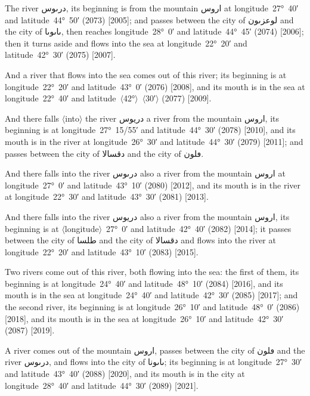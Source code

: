 \documentclass[11pt]{article}
\newcommand{\Pg}[1]{\marginpar{\footnotesize #1}}
\newcommand{\Ang}[1]{\ensuremath{#1}}
\begin{document}
The river \textarabic{درٮوس}, its beginning is from the mountain \textarabic{اروس} at longitude~27°~40′ and latitude~44°~50′ (2073) [2005]; and passes between the city of \textarabic{لوعزٮون} and the city of \textarabic{ٮاٮوٮا}, then reaches longitude~28°~0′ and latitude~44°~45′ (2074) [2006]\Pg{p. 137}; then it turns aside and flows into the sea at longitude~22°~20′ and latitude~42°~30′ (2075) [2007].

And a river that flows into the sea comes out of this river; its beginning is at longitude~22°~20′ and latitude~43°~0′ (2076) [2008], and its mouth is in the sea at longitude~22°~40′ and latitude~\Ang{\langle}42°\Ang{\rangle}~\Ang{\langle}30′\Ang{\rangle} (2077) [2009].

And there falls \Ang{\langle}into\Ang{\rangle} the river \textarabic{دريوس} a river from the mountain \textarabic{اروس}, its beginning is at longitude~27°~15/55′ and latitude~44°~30′ (2078) [2010], and its mouth is in the river at longitude~26°~30′ and latitude~44°~30′ (2079) [2011]; and passes between the city of \textarabic{دقسالا} and the city of \textarabic{ڡلون}.

And there falls into the river \textarabic{درٮوس} also a river from the mountain \textarabic{اروس} at longitude~27°~0′ and latitude~43°~10′ (2080) [2012], and its mouth is in the river at longitude~22°~30′ and latitude~43°~30′ (2081) [2013].

And there falls into the river \textarabic{دريوس} also a river from the mountain \textarabic{اروس}, its beginning is at \Ang{\langle}longitude\Ang{\rangle}~27°~0′ and latitude~42°~40′ (2082) [2014]; it passes between the city of \textarabic{طلسا} and the city of \textarabic{دقسالا} and flows into the river at longitude~22°~20′ and latitude~43°~10′ (2083) [2015].

Two rivers come out of this river, both flowing into the sea: the first of them, its beginning is at longitude~24°~40′ and latitude~48°~10′ (2084) [2016], and its mouth is in the sea at longitude~24°~40′ and latitude~42°~30′ (2085) [2017]; and the second river, its beginning is at longitude~26°~10′ and latitude~48°~0′ (2086) [2018], and its mouth is in the sea at longitude~26°~10′ and latitude~42°~30′ (2087) [2019].

A river comes out of the mountain \textarabic{اروس}, passes between the city of \textarabic{ڡلون} and the river \textarabic{درٮوس}, and flows into the city of \textarabic{ٮاٮونا}; its beginning is at longitude~27°~30′ and latitude~43°~40′ (2088) [2020], and its mouth is in the city at longitude~28°~40′ and latitude~44°~30′ (2089) [2021].
\end{document}
